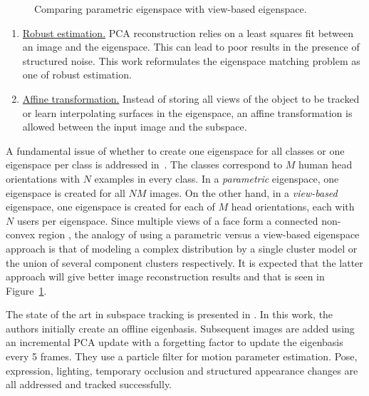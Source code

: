 \begin{figure}[t]
\caption{Comparing parametric eigenspace with view-based eigenspace.}								
\label{fig:parametric_vs_viewBased_eigenspace}				
\end{figure}

\begin{enumerate}
\item \underline{Robust estimation.}  PCA reconstruction relies on a least squares fit between an image and the eigenspace.  This can lead to poor results in the presence of structured noise.  This work reformulates the eigenspace matching problem as one of robust estimation.
\item \underline{Affine transformation.} Instead of storing all views of the object to be tracked or learn interpolating surfaces in the eigenspace, an affine transformation is allowed between the input image and the subspace.
\end{enumerate}

A fundamental issue of whether to create one eigenspace for all classes or one eigenspace per class is addressed in~\cite{1997_JNL_EigenTRK_Moghaddam}.  The classes correspond to $M$ human head orientations with $N$ examples in every class.  In a \emph{parametric} eigenspace, one eigenspace is created for all $NM$ images.  On the other hand, in a \emph{view-based} eigenspace, one eigenspace is created for each of $M$ head orientations, each with $N$ users per eigenspace.  Since multiple views of a face form a connected non-convex region \cite{1994_JNL_FaceTop_Bichsel}, the analogy of using a parametric versus a view-based eigenspace approach is that of modeling a complex distribution by a single cluster model or the union of several component clusters respectively.  It is expected that the latter approach will give better image reconstruction results and that is seen in Figure~\ref{fig:parametric_vs_viewBased_eigenspace}.  

The state of the art in subspace tracking is presented in \cite{2008_JNL_subspaceTRK_Ross}.  In this work, the authors initially create an offline eigenbasis.  Subsequent images are added using an incremental PCA update with a forgetting factor to update the eigenbasis every 5 frames.  They use a particle filter for motion parameter estimation.  Pose, expression, lighting, temporary occlusion and structured appearance changes are all addressed and tracked successfully.

